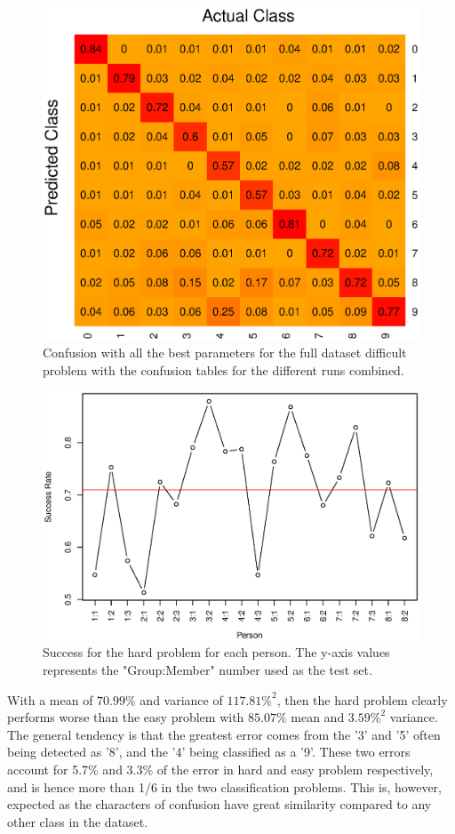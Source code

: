 \begin{figure}[H]
\centering
\includegraphics[width = 0.65 \textwidth]{graphics/knn_confusion_bestparam_hard}
\caption{Confusion with all the best parameters for the full dataset difficult problem with the confusion tables for the different runs combined.}
\label{fig:knn_conf_final_hard}
\end{figure}


\begin{figure}[H]
\centering
\includegraphics[width = 0.95 \textwidth]{graphics/knn_final_full_hard}
\caption{Success for the hard problem for each person.
The y-axis values represents the "Group:Member" number used as the test set.}
\label{fig:knn_succ_final_hard}
\end{figure}

With a mean of $70.99\%$ and variance of  $117.81\%^2$, then the hard problem clearly performs worse than the easy problem with $85.07\%$ mean and $3.59\%^2$ variance.
The general tendency is that the greatest error comes from the '3' and '5' often being detected as '8', and the '4' being classified as a '9'.
These two errors account for 5.7\% and 3.3\% of the error in hard and easy problem respectively, and is hence more than 1/6 in the two classification problems.
This is, however, expected as the characters of confusion have great similarity compared to any other class in the dataset.

